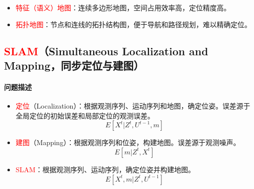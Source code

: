 \documentclass[
12pt, %
a4paper, 
oneside, %
]{scrartcl}
\begin{document}
\begin{itemize}
\begin{itemize}
\begin{itemize}
有对数几率更新公式：
\begin{align*}
l_{i, n} &= \log\frac{p(m_i|s_1, s_2, \cdots, s_n)}{p(\bar{m}_i|s_1, s_2, \cdots, s_n)} = \log\frac{p(m_i|s_n)p(\bar{m}_i)p(m_i|s_1, s_2, \cdots, s_{n - 1})}{p(\bar{m}_i|s_n)p(m_i)p(\bar{m}_i|s_1, s_2, \cdots, s_{n - 1})} \\
&= \log\frac{p(m_i|s_n)}{p(\bar{m}_i|s_n)} + \underbrace{\log\frac{p(\bar{m}_i)}{p(m_i)}}_{l_0\text{与测量无关}} + \log\frac{p(m_i|s_1, s_2, \cdots, s_{n - 1})}{p(\bar{m}_i|s_1, s_2, \cdots, s_{n - 1})} \\
&= \log\frac{p(m_i|s_n)}{p(\bar{m}_i|s_n)} + \underbrace{l_0}_{\text{占用情况未知时，令}p(m_i) = 0.5, l_0 = 0} + l_{i, n - 1}
\end{align*}
\end{itemize}
\item 特点
\begin{itemize}
\item 优点：可以详细描述环境信息，易于定位和路径规划，无需预定义尺寸。
\item 缺点：存储要求高，存在盲区和空洞，需判断占用和联通状态，不具有通用性。
\end{itemize}
\item 拓展
\begin{itemize}
\item 2.5维占用栅格地图（扩展高度图）：为每个栅格附加高度信息（障碍物最高高度）。
\item 3维占用栅格地图（Voxel Map，体素地图）：将空间分解为正方体，判断占用情况。
\item 多分辨率地图：障碍质密处栅格小，无障碍处栅格大，空间占用效率高，计算复杂度高，存储存在稀疏特征。
\end{itemize}
\end{itemize}
\item \textcolor{red}{特征（语义）地图}：连续多边形地图，空间占用效率高，定位精度高。
\item \textcolor{red}{拓扑地图}：节点和连线的拓扑结构图，便于导航和路径规划，难以精确定位。
\end{itemize}
\subsection[SLAM]{\textcolor{red}{SLAM}（Simultaneous Localization and Mapping，同步定位与建图）}
\paragraph{问题描述}
\begin{itemize}
\item \textcolor{red}{定位}（Localization）：根据观测序列、运动序列和地图，确定位姿。误差源于全局定位的初始误差和局部定位的观测误差。
$$ E[X^t|Z^t, U^{t - 1}, m] $$
\item \textcolor{red}{建图}（Mapping）：根据观测序列和位姿，构建地图。误差源于观测噪声。
$$ E[m|Z^t, X^t] $$
\item \textcolor{red}{SLAM}：根据观测序列、运动序列，确定位姿并构建地图。
$$ E[X^t, m|Z^t, U^{t - 1}] $$
\end{itemize}
\end{document}
